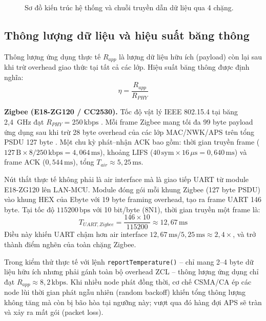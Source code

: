 \begin{figure}[htbp]
{
            }
            \caption{Sơ đồ kiến trúc hệ thống và chuỗi truyền dẫn dữ liệu qua 4 chặng.}
            \label{fig:system_architecture}
        \end{figure}

        \subsection{Thông lượng dữ liệu và hiệu suất băng thông}
 
        Thông lượng ứng dụng thực tế $R_{app}$ là lượng dữ liệu hữu ích (payload) còn lại sau khi trừ overhead giao thức tại tất cả các lớp. Hiệu suất băng thông được định nghĩa:
        \[ \eta = \frac{R_{app}}{R_{PHY}} \]
        
        \textbf{Zigbee (E18-ZG120 / CC2530).} Tốc độ vật lý IEEE 802.15.4 tại băng 2,4~GHz đạt $R_{PHY} = 250\,\text{kbps}$ \cite{ieee802154_2020}. Mỗi frame Zigbee mang tối đa 99 byte payload ứng dụng sau khi trừ 28 byte overhead của các lớp MAC/NWK/APS trên tổng PSDU 127 byte \cite{zigbee_spec_r21}. Một chu kỳ phát--nhận ACK bao gồm: thời gian truyền frame ($127\,\text{B} \times 8 / 250\,\text{kbps} = 4{,}064\,\text{ms}$), khoảng LIFS ($40\,\text{sym} \times 16\,\mu\text{s} = 0{,}640\,\text{ms}$) và frame ACK ($0{,}544\,\text{ms}$), tổng $T_{air} \approx 5{,}25\,\text{ms}$.
        
        Nút thắt thực tế không phải là air interface mà là giao tiếp UART từ module E18-ZG120 lên LAN-MCU. Module đóng gói mỗi khung Zigbee (127 byte PSDU) vào khung HEX của Ebyte với 19 byte framing overhead, tạo ra frame UART 146 byte. Tại tốc độ $115200\,\text{bps}$ với 10 bit/byte (8N1), thời gian truyền một frame là:
        \[ T_{UART,Zigbee} = \frac{146 \times 10}{115200} \approx 12{,}67\,\text{ms} \]
        Điều này khiến UART chậm hơn air interface $12{,}67\,\text{ms} / 5{,}25\,\text{ms} \approx 2{,}4\times$, và trở thành điểm nghẽn của toàn chặng Zigbee.
        
        Trong kiểm thử thực tế với lệnh \texttt{reportTemperature()} -- chỉ mang 2--4 byte dữ liệu hữu ích nhưng phải gánh toàn bộ overhead ZCL -- thông lượng ứng dụng chỉ đạt $R_{app} \approx 8{,}2\,\text{kbps}$. Khi nhiều node phát đồng thời, cơ chế CSMA/CA ép các node lùi thời gian phát ngẫu nhiên (random backoff) khiến tổng thông lượng không tăng mà còn bị bão hòa tại ngưỡng này; vượt qua đó hàng đợi APS sẽ tràn và xảy ra mất gói (packet loss).
        

